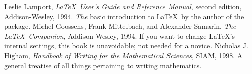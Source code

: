\documentclass[12pt]{article}
\begin{document}
\begin{thebibliography}{9}
  Leslie Lamport, \emph{\LaTeX\ User's Guide and Reference Manual},
  second edition, Addison-Wesley, 1994. \emph{The} basic introduction
  to \LaTeX\ by the author of the package.
  Michel Goossens, Frank Mittelbach, and Alexander Samarin,
  \emph{The \LaTeX\ Companion}, Addison-Wesley, 1994.
  If you want to change \LaTeX's internal settings, this book
  is unavoidable; not needed for a novice.
  Nicholas J. Higham, \emph{Handbook of Writing for the Mathematical Sciences},
  SIAM, 1998. A general treatise of all things pertaining to writing
  mathematics.
\end{thebibliography}
\end{document}

